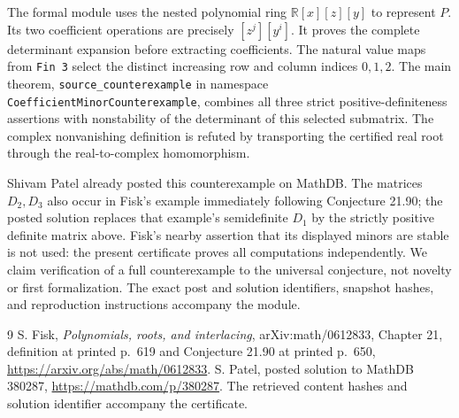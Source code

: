 \documentclass[11pt]{article}
\begin{document}
The formal module uses the nested polynomial ring $\mathbb R[x][z][y]$ to represent $P$. Its two coefficient operations are precisely $[z^j][y^i]$. It proves the complete determinant expansion before extracting coefficients. The natural value maps from \texttt{Fin 3} select the distinct increasing row and column indices $0,1,2$. The main theorem, \texttt{source\_counterexample} in namespace \texttt{CoefficientMinorCounterexample}, combines all three strict positive-definiteness assertions with nonstability of the determinant of this selected submatrix. The complex nonvanishing definition is refuted by transporting the certified real root through the real-to-complex homomorphism.

Shivam Patel already posted this counterexample on MathDB. The matrices $D_2,D_3$ also occur in Fisk's example immediately following Conjecture 21.90; the posted solution replaces that example's semidefinite $D_1$ by the strictly positive definite matrix above. Fisk's nearby assertion that its displayed minors are stable is not used: the present certificate proves all computations independently. We claim verification of a full counterexample to the universal conjecture, not novelty or first formalization. The exact post and solution identifiers, snapshot hashes, and reproduction instructions accompany the module.
\begin{thebibliography}{9}
 S. Fisk, \emph{Polynomials, roots, and interlacing}, arXiv:math/0612833, Chapter 21, definition at printed p.~619 and Conjecture 21.90 at printed p.~650, \url{https://arxiv.org/abs/math/0612833}.
 S. Patel, posted solution to MathDB 380287, \url{https://mathdb.com/p/380287}. The retrieved content hashes and solution identifier accompany the certificate.
\end{thebibliography}
\end{document}
